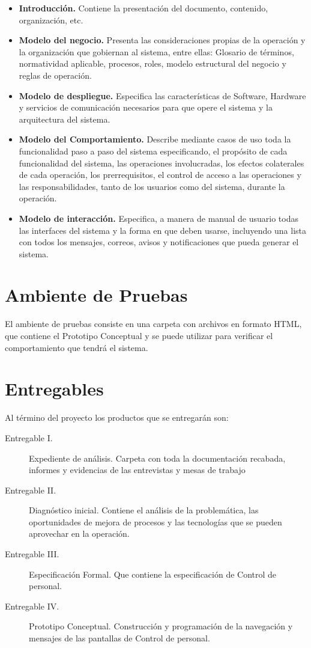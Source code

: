 \documentclass[10pt]{book}
\newcommand{\nombreProyecto}{ Control de personal}
\begin{document}
\begin{itemize}
	\item {\bf Introducción.} Contiene la presentación del documento, contenido, organización, etc.
	\item {\bf Modelo del negocio.} Presenta las consideraciones propias de la operación y la organización que gobiernan al sistema, entre ellas: Glosario de términos, normatividad aplicable, procesos, roles, modelo estructural del negocio y reglas de operación.
	\item {\bf Modelo de despliegue.} Especifica las características de Software, Hardware y servicios de comunicación necesarios para que opere el sistema y la arquitectura del sistema.
	\item {\bf Modelo del Comportamiento.} Describe mediante casos de uso toda la funcionalidad paso a paso del sistema especificando, el propósito de cada funcionalidad del sistema, las operaciones involucradas, los efectos colaterales de cada operación, los prerrequisitos, el control de acceso a las operaciones y las responsabilidades, tanto de los usuarios como del sistema, durante la operación.
	\item {\bf Modelo de interacción.} Especifica, a manera de manual de usuario todas las interfaces del sistema y la forma en que deben usarse, incluyendo una lista con todos los mensajes, correos, avisos y notificaciones que pueda generar el sistema.
\end{itemize}


\section{Ambiente de Pruebas}

	El ambiente de pruebas consiste en una carpeta con archivos en formato HTML, que contiene el Prototipo Conceptual y se puede utilizar para verificar el comportamiento que tendrá el sistema.

\section{Entregables}
	
	Al término del proyecto los productos que se entregarán son:
	
\begin{description}
	\item [Entregable I.] Expediente de análisis. Carpeta con toda la documentación recabada, informes y evidencias de las entrevistas y mesas de trabajo
	\item [Entregable II.] Diagnóstico inicial. Contiene el análisis de la problemática, las oportunidades de mejora de procesos y las tecnologías que se pueden aprovechar en la operación.
	\item [Entregable III.] Especificación Formal. Que contiene la especificación de \nombreProyecto.
	\item [Entregable IV.] Prototipo Conceptual. Construcción y programación de la navegación y mensajes de las pantallas de \nombreProyecto.
\end{description}
\end{document}
